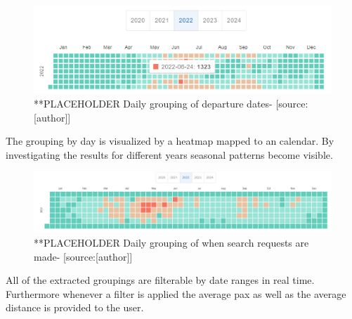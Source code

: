 \begin{figure}[H]
	\centering
		\includegraphics[width=15cm]{images/grouping_by_taskFrom}
	\caption{ **PLACEHOLDER Daily grouping of departure dates- [source:[author]]}
	\label{fig:grouping_dep_daily}
\end{figure}
The grouping by day is visualized by a heatmap mapped to an calendar. By investigating the results for different years seasonal patterns become visible.
\begin{figure}[H]
	\centering
		\includegraphics[width=15cm]{images/grouping_by_created_at}
	\caption{**PLACEHOLDER Daily grouping of when search requests are made- [source:[author]]}
	\label{fig:grouping_search_daily}
\end{figure}
All of the extracted groupings are filterable by date ranges in real time. Furthermore whenever a filter is applied the average pax as well as the average distance is provided to the user.